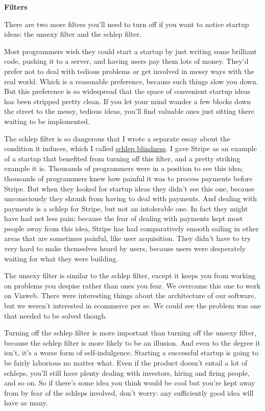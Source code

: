 \documentclass[12pt]{book}
\begin{document}
\textbf{Filters}

There are two more filters you'll need to turn off if you want to notice
startup ideas: the unsexy filter and the schlep filter.

Most programmers wish they could start a startup by just writing some
brilliant code, pushing it to a server, and having users pay them lots
of money. They'd prefer not to deal with tedious problems or get
involved in messy ways with the real world. Which is a reasonable
preference, because such things slow you down. But this preference is so
widespread that the space of convenient startup ideas has been stripped
pretty clean. If you let your mind wander a few blocks down the street
to the messy, tedious ideas, you'll find valuable ones just sitting
there waiting to be implemented.

The schlep filter is so dangerous that I wrote a separate essay about
the condition it induces, which I called \href{schlep.html}{schlep
blindness}. I gave Stripe as an example of a startup that benefited from
turning off this filter, and a pretty striking example it is. Thousands
of programmers were in a position to see this idea; thousands of
programmers knew how painful it was to process payments before Stripe.
But when they looked for startup ideas they didn't see this one, because
unconsciously they shrank from having to deal with payments. And dealing
with payments is a schlep for Stripe, but not an intolerable one. In
fact they might have had net less pain; because the fear of dealing with
payments kept most people away from this idea, Stripe has had
comparatively smooth sailing in other areas that are sometimes painful,
like user acquisition. They didn't have to try very hard to make
themselves heard by users, because users were desperately waiting for
what they were building.

The unsexy filter is similar to the schlep filter, except it keeps you
from working on problems you despise rather than ones you fear. We
overcame this one to work on Viaweb. There were interesting things about
the architecture of our software, but we weren't interested in ecommerce
per se. We could see the problem was one that needed to be solved
though.

Turning off the schlep filter is more important than turning off the
unsexy filter, because the schlep filter is more likely to be an
illusion. And even to the degree it isn't, it's a worse form of
self-indulgence. Starting a successful startup is going to be fairly
laborious no matter what. Even if the product doesn't entail a lot of
schleps, you'll still have plenty dealing with investors, hiring and
firing people, and so on. So if there's some idea you think would be
cool but you're kept away from by fear of the schleps involved, don't
worry: any sufficiently good idea will have as many.
\end{document}
